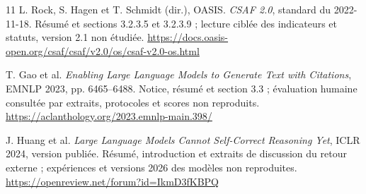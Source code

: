 \documentclass[11pt,a4paper]{article}
\begin{document}
\begin{thebibliography}{11}
L. Rock, S. Hagen et T. Schmidt (dir.), OASIS. \emph{CSAF 2.0}, standard du 2022-11-18. Résumé et sections 3.2.3.5 et 3.2.3.9 ; lecture ciblée des indicateurs et statuts, version 2.1 non étudiée.
\url{https://docs.oasis-open.org/csaf/csaf/v2.0/os/csaf-v2.0-os.html}

T. Gao et al. \emph{Enabling Large Language Models to Generate Text with Citations}, EMNLP 2023, pp. 6465--6488. Notice, résumé et section 3.3 ; évaluation humaine consultée par extraits, protocoles et scores non reproduits.
\url{https://aclanthology.org/2023.emnlp-main.398/}

J. Huang et al. \emph{Large Language Models Cannot Self-Correct Reasoning Yet}, ICLR 2024, version publiée. Résumé, introduction et extraits de discussion du retour externe ; expériences et versions 2026 des modèles non reproduites.
\url{https://openreview.net/forum?id=IkmD3fKBPQ}
\end{thebibliography}
\end{document}
